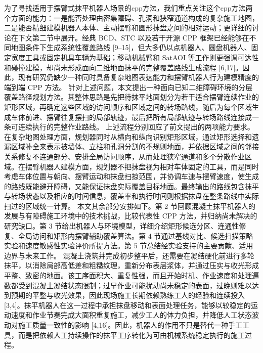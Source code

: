 {}为了寻找适用于摆臂式抹平机器人场景的cpp方法，我们重点关注这个cpp方法两个方面的能力：一是能否处理由密集障碍、孔洞和狭窄通道构成的复杂施工地图，二是能否精细建模机器人本体、主动摆臂和圆形抹盘之间的相对运动；更详细的讨论在下文第二节中展开。经典 BCD、STC 以及若干开源 CPP 框架已经能够在不同地图条件下生成系统性覆盖路线 [9–15]，但大多仍以点机器人、圆盘机器人、固定宽度工具或固定机具车辆为基础；移动机械臂和 SatAOI 等工作则更强调可达性和碰撞建模，却尚未形成面向二维地面抹平的完整覆盖路线生成流程 [6,17]。因此，现有研究仍缺少一种同时具备复杂地图表达能力和摆臂机器人行为建模精度的端到端 CPP 方法。\markdownRendererParagraphSeparator
{}针对上述问题，本文提出一种面向已知二维障碍环境的分层覆盖路径规划方法。其整体思路是先把待抹平地面划分为若干适合摆臂连续作业的矩形区域，再确定这些区域的访问顺序和区域之间的转场路线，随后为每个区域生成车体前进、摆臂往复摆扫的局部轨迹，最后把所有局部轨迹与转场路线连接成一条可连续执行的完整作业路线。\markdownRendererParagraphSeparator
{}上述流程分别回应了前文提出的两项能力要求。在复杂地图处理方面，规划器同时从横向和纵向识别矩形区域，通过矩形选择和遗漏区域补全来表示被墙体、立柱和孔洞分割的不规则地面，并依据区域之间的邻接关系修复不连通部分、安排全局访问顺序，从而处理狭窄通道和多个分散作业区域。在摆臂机器人建模方面，规划器不把抹盘视为相对车体固定的工具，而是同时考虑车体位置与朝向、摆臂运动和抹盘扫掠范围，并协调车速与摆臂速度，使生成的路线既能避开障碍，又能保证抹盘实际覆盖目标地面。最终输出的路线包含抹平与转场状态以及相应的时间信息，覆盖率和执行时间则根据抹盘在整条路线中实际扫过的区域统一计算。\markdownRendererParagraphSeparator
{}本文其余部分安排如下。第 2 节回顾混凝土抹平机器人的发展与有障碍施工环境中的技术挑战，比较代表性 CPP 方法，并归纳尚未解决的研究缺口。第 3 节给出机器人与环境模型，详细介绍矩形候选分区、连通性修复、全局访问和矩形内摆臂辅助覆盖算法。第 4 节通过基线对比、候选扫描策略实验和速度敏感性实验评价所提方法。第 5 节总结经实验支持的主要贡献、适用边界与未来工作。\markdownRendererParagraphSeparator
{}
\markdownRendererSectionEnd \markdownRendererSectionBegin
{}\markdownRendererParagraphSeparator
{}\markdownRendererSectionBegin
{}\markdownRendererInterblockSeparator
{}混凝土浇筑并完成初步整平后，还需要在凝结硬化前进行多轮抹平，以消除局部高低差和粗糙纹理，重新分布表层浆体，并通过压实与收光形成平整、致密的地面。该工序面积大、重复性强，而且开始时机、作业速度和处理遍数都受到混凝土凝结状态限制；过早作业可能扰动尚未稳定的表面，过晚则难以达到预期的平整与收光效果，因此现场施工长期依赖熟练工人的经验和连续投入 [3,4]。抹平机器人在这一过程中承担抹盘移动和表面处理任务，能够以较稳定的运动速度和作业节奏完成大面积重复施工，减少工人的体力负担，并降低人工状态波动对施工质量一致性的影响 [4,16]。因此，机器人的作用不只是替代一种手工工具，而是把依赖人工持续操作的抹平工序转化为可由机械系统稳定执行的施工过程。\markdownRendererParagraphSeparator
